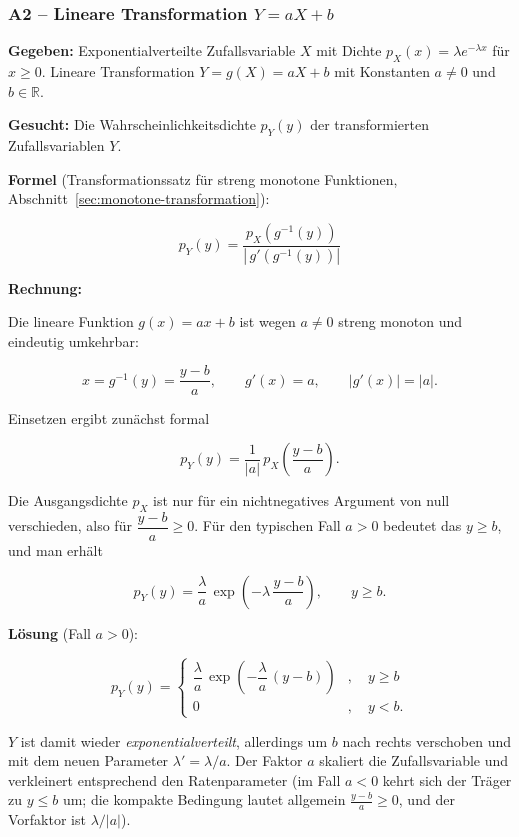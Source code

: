 \subsubsection*{A2 – Lineare Transformation $Y = aX + b$}

\begin{beispiel}[Funktion einer Zufallsvariablen -- $Y = aX + b$]

\textbf{Gegeben:} Exponentialverteilte Zufallsvariable $X$ mit Dichte
$p_X(x) = \lambda e^{-\lambda x}$ für $x \geq 0$. Lineare Transformation
$Y = g(X) = aX + b$ mit Konstanten $a \neq 0$ und $b \in \mathbb{R}$.

\textbf{Gesucht:} Die Wahrscheinlichkeitsdichte $p_Y(y)$ der transformierten
Zufallsvariablen $Y$.

\textbf{Formel} (Transformationssatz für streng monotone Funktionen,
Abschnitt~\ref{sec:monotone-transformation}):

$$
p_Y(y) = \frac{p_X\!\left(g^{-1}(y)\right)}{\left|\, g'\!\left(g^{-1}(y)\right)\right|}
$$

\textbf{Rechnung:}

Die lineare Funktion $g(x) = ax + b$ ist wegen $a \neq 0$ streng monoton und
eindeutig umkehrbar:

$$
x = g^{-1}(y) = \frac{y - b}{a}, \qquad g'(x) = a, \qquad |g'(x)| = |a|.
$$

Einsetzen ergibt zunächst formal

$$
p_Y(y) = \frac{1}{|a|}\, p_X\!\left(\frac{y - b}{a}\right).
$$

Die Ausgangsdichte $p_X$ ist nur für ein nichtnegatives Argument von null
verschieden, also für $\dfrac{y - b}{a} \geq 0$. Für den typischen Fall
$a > 0$ bedeutet das $y \geq b$, und man erhält

$$
p_Y(y) = \frac{\lambda}{a}\,
         \exp\!\left(-\lambda\,\frac{y - b}{a}\right), \qquad y \geq b.
$$

\textbf{Lösung} (Fall $a > 0$):

$$
\boxed{\;p_Y(y) = \begin{cases}
\dfrac{\lambda}{a}\, \exp\!\left(-\dfrac{\lambda}{a}\,(y - b)\right)
  & , \quad y \geq b \\[8pt]
0 & , \quad y < b.
\end{cases}\;}
$$

$Y$ ist damit wieder \emph{exponentialverteilt}, allerdings um $b$ nach rechts
verschoben und mit dem neuen Parameter $\lambda' = \lambda/a$. Der Faktor $a$
skaliert die Zufallsvariable und verkleinert entsprechend den Ratenparameter
(im Fall $a < 0$ kehrt sich der Träger zu $y \leq b$ um; die kompakte
Bedingung lautet allgemein $\tfrac{y-b}{a} \geq 0$, und der Vorfaktor ist
$\lambda/|a|$).

\end{beispiel}

